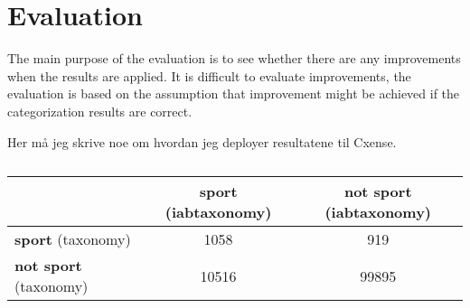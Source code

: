 \section{Evaluation}
The main purpose of the evaluation is to see whether there are any improvements when the results are applied. It is difficult to evaluate improvements, the evaluation is based on the assumption that improvement might be achieved if the categorization results are correct. 



\begin{code}

Her må jeg skrive noe om hvordan jeg deployer resultatene til Cxense. 

\end{code}

\begin{table}[ht]
\centering
\renewcommand{\arraystretch}{1.25}
\begin{tabularx}{\textwidth}{l |c|c}
 & \textbf{sport} (iabtaxonomy) & \textbf{not sport} (iabtaxonomy)\\ \hline
 \textbf{sport} (taxonomy) & 1058 & 919 \\ \hline
 \textbf{not sport} (taxonomy) & 10516 & 99895
\end{tabularx}
\\[10pt]
\caption{}
\label{tab:}
\end{table}


\begin{comment}
Date: 15/04/15

Med: igg-iabtaxonomy-sports
     taxonomy-sports
{
  "start": 1428671088, 
  "stop": 1429103088, 
  "data": {
    "events": 185237, 
    "urls": 1058
  }
}


Med: taxonomy-sports
Uten: igg-iabtaxonomy-sports
{
  "start": 1428673680, 
  "stop": 1429105680, 
  "data": {
    "events": 105114, 
    "urls": 919
  }
}

Med: igg-iabtaxonomy-sports
Uten: taxonomy-sports
{
  "start": 1428673711, 
  "stop": 1429105711, 
  "data": {
    "events": 1875914, 
    "urls": 10516
  }
}

Uten: igg-iabtaxonomy-sports
      taxonomy-sports
{
  "start": 1428673813, 
  "stop": 1429105813, 
  "data": {
    "events": 876519, 
    "urls": 9995
  }
}

\end{comment}





